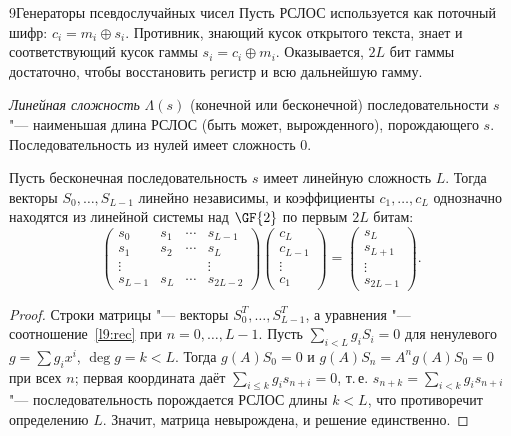 \begin{lecture}{9}{Генераторы псевдослучайных чисел}
Пусть РСЛОС используется как поточный шифр: $c_i = m_i \oplus s_i$. Противник, знающий кусок
открытого текста, знает и соответствующий кусок гаммы $s_i = c_i \oplus m_i$. Оказывается, $2L$
бит гаммы достаточно, чтобы восстановить регистр и всю дальнейшую гамму.

\begin{definition}
\emph{Линейная сложность} $\Lambda(s)$ (конечной или бесконечной) последовательности
$s$ "--- наименьшая длина РСЛОС (быть может, вырожденного), порождающего $s$. Последовательность
из нулей имеет сложность $0$.
\end{definition}

\begin{proposition}\label{l9:hankel}
Пусть бесконечная последовательность $s$ имеет линейную сложность $L$. Тогда векторы
$S_0, \dots, S_{L-1}$ линейно независимы, и коэффициенты $c_1, \dots, c_L$ однозначно находятся из
линейной системы над $\GF{2}$ по первым $2L$ битам:
\begin{equation}\label{l9:system}
  \begin{pmatrix}
    s_0 & s_1 & \cdots & s_{L-1}\\
    s_1 & s_2 & \cdots & s_L\\
    \vdots & & & \vdots\\
    s_{L-1} & s_L & \cdots & s_{2L-2}
  \end{pmatrix}
  \begin{pmatrix} c_L\\ c_{L-1}\\ \vdots\\ c_1 \end{pmatrix}
  =
  \begin{pmatrix} s_L\\ s_{L+1}\\ \vdots\\ s_{2L-1} \end{pmatrix}.
\end{equation}
\end{proposition}

\begin{proof}
Строки матрицы "--- векторы $S_0^T, \dots, S_{L-1}^T$, а уравнения "--- соотношение~\eqref{l9:rec}
при $n = 0, \dots, L - 1$. Пусть $\sum_{i<L} g_i S_i = 0$ для ненулевого $g = \sum g_i x^i$,
$\deg g = k < L$. Тогда $g(A) S_0 = 0$ и $g(A) S_n = A^n g(A) S_0 = 0$ при всех $n$; первая
координата даёт $\sum_{i \le k} g_i s_{n+i} = 0$, т.\,е. $s_{n+k} = \sum_{i<k} g_i s_{n+i}$ "---
последовательность порождается РСЛОС длины $k < L$, что противоречит определению $L$.
Значит, матрица невырождена, и решение единственно.
\end{proof}


\end{lecture}
